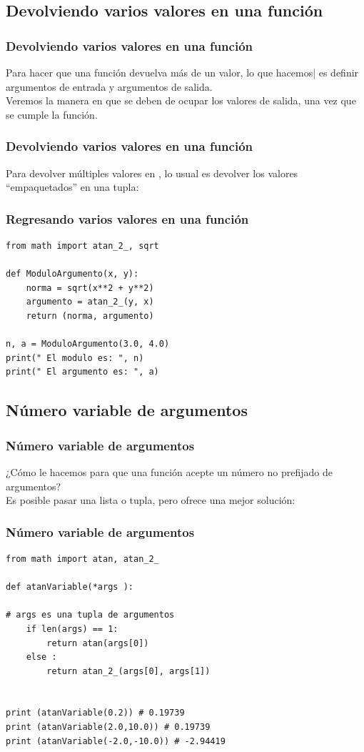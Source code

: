 \subsection{Devolviendo varios valores en una función}
\begin{frame}[fragile]
\frametitle{Devolviendo varios valores en una función}
Para hacer que una función devuelva más de un valor, lo que hacemos| es definir argumentos de entrada y argumentos de salida.
\\
\bigskip
Veremos la manera en que se deben de ocupar los valores de salida, una vez que se cumple la función.
\end{frame}
\begin{frame}[fragile]
\frametitle{Devolviendo varios valores en una función}
Para devolver múltiples valores en \python, lo usual es devolver los valores \enquote{empaquetados} en una tupla:
\end{frame}
\begin{frame}[fragile]
\frametitle{Regresando varios valores en una función}
\begin{lstlisting}[style=codigopython]
from math import atan_2_, sqrt

def ModuloArgumento(x, y):
    norma = sqrt(x**2 + y**2)
    argumento = atan_2_(y, x)
    return (norma, argumento)
    
n, a = ModuloArgumento(3.0, 4.0)
print(" El modulo es: ", n)
print(" El argumento es: ", a)
\end{lstlisting}
\end{frame}
\subsection{Número variable de argumentos}
\begin{frame}[fragile]
\frametitle{Número variable de argumentos}
¿Cómo le hacemos para que una función acepte un número no prefijado de argumentos?
\\
\medskip
Es posible pasar una lista o tupla, pero \python{} ofrece una mejor solución:
\end{frame}
\begin{frame}
\frametitle{Número variable de argumentos}
\begin{lstlisting}[style=codigopython]
from math import atan, atan_2_

def atanVariable(*args ):

# args es una tupla de argumentos
    if len(args) == 1:
        return atan(args[0])
    else :
        return atan_2_(args[0], args[1])


print (atanVariable(0.2)) # 0.19739
print (atanVariable(2.0,10.0)) # 0.19739
print (atanVariable(-2.0,-10.0)) # -2.94419
\end{lstlisting}
\end{frame}
